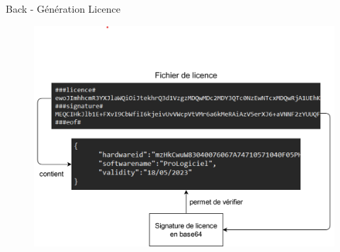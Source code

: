 \documentclass{cubeamer}
\begin{document}
\begin{frame}{Back - Génération Licence}
    \begin{figure}
        \includegraphics[scale=0.5]{img/licence.png}
    \end{figure}    
\end{frame}
\end{document}
